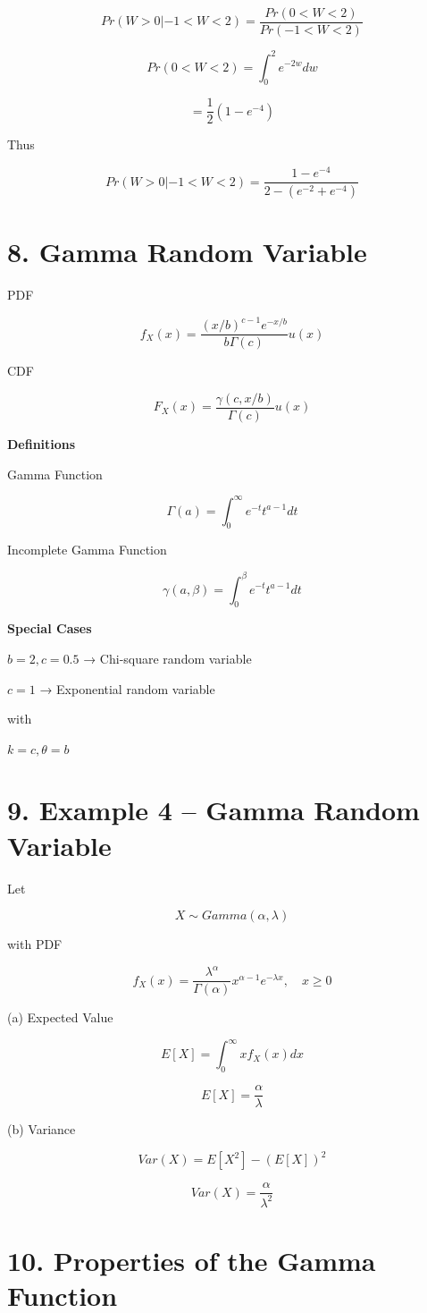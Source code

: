 \documentclass[12pt]{article}
\begin{document}
\[
Pr(W>0|-1<W<2)=\frac{Pr(0<W<2)}{Pr(-1<W<2)}
\]

\[
Pr(0<W<2)=\int_{0}^{2}e^{-2w}dw
\]

\[
=\frac{1}{2}(1-e^{-4})
\]

Thus

\[
Pr(W>0|-1<W<2)=
\frac{1-e^{-4}}{2-(e^{-2}+e^{-4})}
\]

\section*{8. Gamma Random Variable}

PDF

\[
f_X(x)=
\frac{(x/b)^{c-1}e^{-x/b}}{b\Gamma(c)}u(x)
\]

CDF

\[
F_X(x)=
\frac{\gamma(c,x/b)}{\Gamma(c)}u(x)
\]

\textbf{Definitions}

Gamma Function

\[
\Gamma(a)=\int_0^\infty e^{-t}t^{a-1}dt
\]

Incomplete Gamma Function

\[
\gamma(a,\beta)=\int_0^\beta e^{-t}t^{a-1}dt
\]

\textbf{Special Cases}

$b=2, c=0.5$ → Chi-square random variable

$c=1$ → Exponential random variable

with

$k=c, \theta=b$

\section*{9. Example 4 – Gamma Random Variable}

Let

\[
X \sim Gamma(\alpha,\lambda)
\]

with PDF

\[
f_X(x)=
\frac{\lambda^\alpha}{\Gamma(\alpha)}x^{\alpha-1}e^{-\lambda x},\quad x\ge0
\]

(a) Expected Value

\[
E[X]=\int_0^\infty x f_X(x)dx
\]

\[
E[X]=\frac{\alpha}{\lambda}
\]

(b) Variance

\[
Var(X)=E[X^2]-(E[X])^2
\]

\[
Var(X)=\frac{\alpha}{\lambda^2}
\]

\section*{10. Properties of the Gamma Function}
\end{document}
